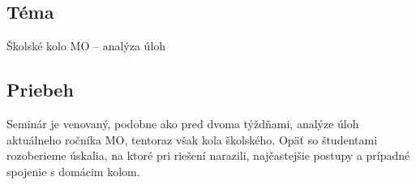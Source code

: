 
\subsection*{Téma}
Školské kolo MO -- analýza úloh

\subsection*{Priebeh}

Seminár je venovaný, podobne ako pred dvoma týždňami, analýze úloh aktuálneho ročníka MO, tentoraz však kola školského. Opäť so študentami rozoberieme úskalia, na ktoré pri riešení narazili, najčastejšie postupy a prípadné spojenie s domácim kolom.






